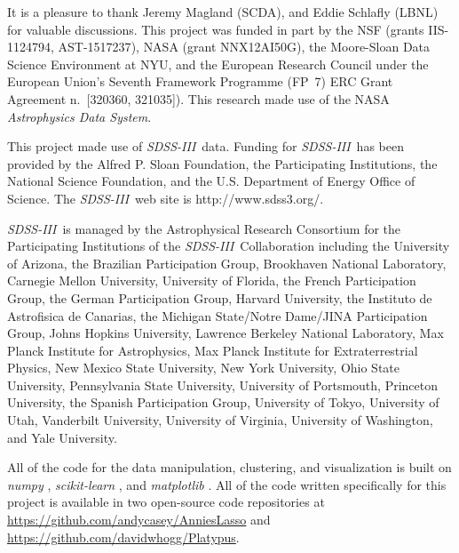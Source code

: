 \documentclass[12pt, letterpaper, preprint]{aastex}
\newcommand{\acronym}[1]{{\small{#1}}}
\newcommand{\project}[1]{\textsl{#1}}
\newcommand{\sdssiii}{\project{\acronym{SDSS-III}}}
\begin{document}
\acknowledgements
It is a pleasure to thank
  Jeremy Magland (\acronym{SCDA}), and
  Eddie Schlafly (\acronym{LBNL})
for valuable discussions.
This project was funded in part by
  the \acronym{NSF} (grants \acronym{IIS-1124794}, \acronym{AST-1517237}),
  \acronym{NASA} (grant \acronym{NNX12AI50G}),
  the Moore-Sloan Data Science Environment at \acronym{NYU}, and
  the European Research Council under the
  European Union's Seventh Framework Programme (FP~7)
  \acronym{ERC} Grant Agreement n.~\acronym{[320360, 321035]}).
This research made use of the \acronym{NASA} \project{Astrophysics Data System}.

This project made use of \sdssiii\ data.
Funding for \sdssiii\ has been provided by the Alfred P. Sloan
Foundation, the Participating Institutions, the National Science
Foundation, and the \acronym{U.S.} Department of Energy Office of Science. The
\sdssiii\ web site is http://www.sdss3.org/.

\sdssiii\ is managed by the Astrophysical Research Consortium for the
Participating Institutions of the \sdssiii\ Collaboration including the
University of Arizona, the Brazilian Participation Group, Brookhaven
National Laboratory, Carnegie Mellon University, University of
Florida, the French Participation Group, the German Participation
Group, Harvard University, the Instituto de Astrofisica de Canarias,
the Michigan State/Notre Dame/\acronym{JINA} Participation Group, Johns Hopkins
University, Lawrence Berkeley National Laboratory, Max Planck
Institute for Astrophysics, Max Planck Institute for Extraterrestrial
Physics, New Mexico State University, New York University, Ohio State
University, Pennsylvania State University, University of Portsmouth,
Princeton University, the Spanish Participation Group, University of
Tokyo, University of Utah, Vanderbilt University, University of
Virginia, University of Washington, and Yale University.

All of the code for the data manipulation, clustering, and
visualization is built on \project{numpy} \citep{numpy},
\project{scikit-learn} \citep{sklearn}, and \project{matplotlib}
\citep{matplotlib}.
All of the code written specifically for this project is available in
two open-source code repositories at
\url{https://github.com/andycasey/AnniesLasso} and
\url{https://github.com/davidwhogg/Platypus}.
\end{document}
